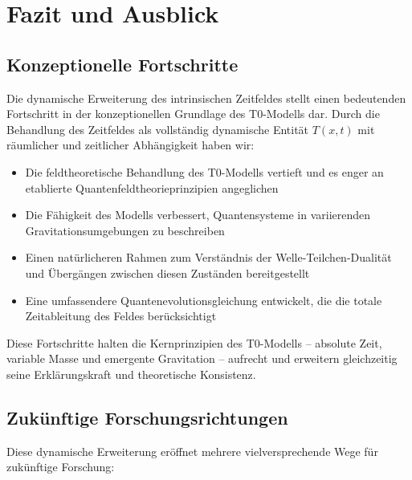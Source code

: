 \documentclass[12pt,a4paper]{article}
\newcommand{\Tfieldt}{T(x,t)}
\begin{document}
	\section{Fazit und Ausblick}
	\label{sec:conclusion}
	
	\subsection{Konzeptionelle Fortschritte}
	\label{subsec:advancements}
	
	Die dynamische Erweiterung des intrinsischen Zeitfeldes stellt einen bedeutenden Fortschritt in der konzeptionellen Grundlage des T0-Modells dar. Durch die Behandlung des Zeitfeldes als vollständig dynamische Entität $\Tfieldt$ mit räumlicher und zeitlicher Abhängigkeit haben wir:
	
	\begin{itemize}
		\item Die feldtheoretische Behandlung des T0-Modells vertieft und es enger an etablierte Quantenfeldtheorieprinzipien angeglichen
		\item Die Fähigkeit des Modells verbessert, Quantensysteme in variierenden Gravitationsumgebungen zu beschreiben
		\item Einen natürlicheren Rahmen zum Verständnis der Welle-Teilchen-Dualität und Übergängen zwischen diesen Zuständen bereitgestellt
		\item Eine umfassendere Quantenevolutionsgleichung entwickelt, die die totale Zeitableitung des Feldes berücksichtigt
	\end{itemize}
	
	Diese Fortschritte halten die Kernprinzipien des T0-Modells – absolute Zeit, variable Masse und emergente Gravitation – aufrecht und erweitern gleichzeitig seine Erklärungskraft und theoretische Konsistenz.
	
	\subsection{Zukünftige Forschungsrichtungen}
	\label{subsec:future_research}
	
	Diese dynamische Erweiterung eröffnet mehrere vielversprechende Wege für zukünftige Forschung:
	
\end{document}
